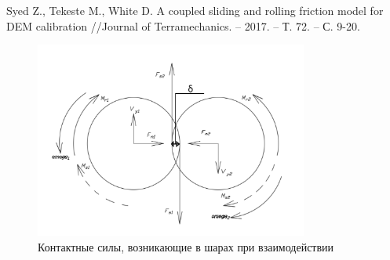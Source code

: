 \documentclass[c]{beamer}  %
\begin{document}
\begin{frame}
\frametitle{\insertsection} 
\framesubtitle{\insertsubsection}
Syed Z., Tekeste M., White D. A coupled sliding and rolling friction model for DEM calibration //Journal of Terramechanics. – 2017. – Т. 72. – С. 9-20.
\begin{figure}[h!]
	\centering
	\includegraphics[width=0.8\textwidth]{sily}
	\caption{Контактные силы, возникающие в шарах при взаимодействии}
\end{figure} 
\end{frame}
\end{document}
